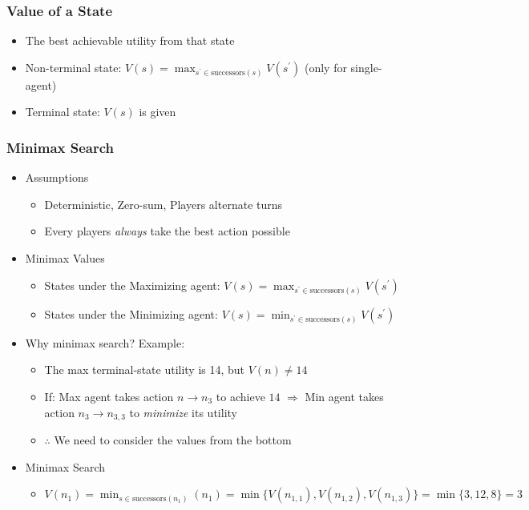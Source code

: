 \subsubsection*{Value of a State}
\begin{itemize}
    \item The best achievable utility from that state
    \item Non-terminal state: $V(s)=\max_{s^\prime\in\text{successors}(s)}V(s^\prime)$ (only for single-agent)
    \item Terminal state: $V(s)$ is given
\end{itemize}

\subsubsection*{Minimax Search}
\begin{itemize}
    \item Assumptions
    \begin{itemize}
        \item Deterministic, Zero-sum, Players alternate turns
        \item Every players \textit{always} take the best action possible
    \end{itemize}
    \item Minimax Values
    \begin{itemize}
        \item States under the Maximizing agent: $V(s)=\max_{s^\prime\in\text{successors}(s)}V(s^\prime)$
        \item States under the Minimizing agent: $V(s)=\min_{s^\prime\in\text{successors}(s)}V(s^\prime)$
    \end{itemize}
    \item Why minimax search? Example:
    \begin{itemize}
        \item The max terminal-state utility is 14, but $V(n)\neq14$
        \item If: Max agent takes action $n\to n_3$ to achieve $14$ $\Rightarrow$ Min agent takes action $n_3\to n_{3,3}$ to \textit{minimize} its utility
        \item $\therefore$ We need to consider the values from the bottom
    \end{itemize}
    \clearpage
    \item Minimax Search
    \begin{itemize}
        \item $V(n_1)=\min_{s\in\text{successors}(n_1)}(n_1)=\min\{V(n_{1,1}),V(n_{1,2}),V(n_{1,3})\}=\min\{3,12,8\}=3$

\end{itemize}
\end{itemize}
